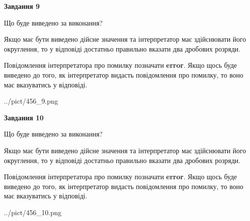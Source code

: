 \documentclass[12pt, ukrainian]{article}
\begin{document}
{\begin {Large}
{\begin {center}\textbf{Завдання 9}\end {center}}\par
Що буде виведено за виконання? \par

Якщо має бути виведено дійсне значення та інтерпретатор має здійснювати його округлення, 
то у відповіді достатньо правильно вказати два дробових розряди.

Повідомлення інтерпретатора про помилку позначати \textbf{error}.
Якщо щось буде виведено до того, як інтерпретатор видасть повідомлення про помилку, 
то воно має вказуватись у відповіді. \par

\begin{center}
	{../pict/456_9.png}
\end{center}
\newpage

{\begin {center}\textbf{Завдання 10}\end {center}}\par
Що буде виведено за виконання? \par

Якщо має бути виведено дійсне значення та інтерпретатор має здійснювати його округлення, 
то у відповіді достатньо правильно вказати два дробових розряди.

Повідомлення інтерпретатора про помилку позначати \textbf{error}.
Якщо щось буде виведено до того, як інтерпретатор видасть повідомлення про помилку, 
то воно має вказуватись у відповіді. \par

\begin{center}
	{../pict/456_10.png}
\end{center}
\newpage

\end {Large}}
\end{document}

